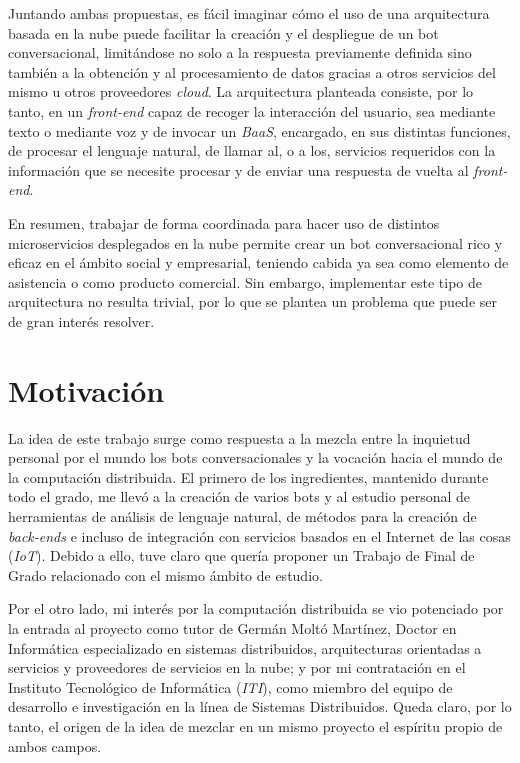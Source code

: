 \documentclass[11pt,spanish,listoffigures]{tfgetsinf}
\begin{document}
Juntando ambas propuestas, es fácil imaginar cómo el uso de una arquitectura basada en la nube puede facilitar la creación y el despliegue de un bot conversacional, limitándose no solo a la respuesta previamente definida sino también a la obtención y al procesamiento de datos gracias a otros servicios del mismo u otros proveedores \textit{\gls{cloud}}. La arquitectura planteada consiste, por lo tanto, en un \textit{\gls{front-end}} capaz de recoger la interacción del usuario, sea mediante texto o mediante voz y de invocar un \textit{BaaS}, encargado, en sus distintas funciones, de procesar el lenguaje natural, de llamar al, o a los, servicios requeridos con la información que se necesite procesar y de enviar una respuesta de vuelta al \textit{front-end}. 

En resumen, trabajar de forma coordinada para hacer uso de distintos \gls{microservicio}s desplegados en la nube permite crear un bot conversacional rico y eficaz en el ámbito social y empresarial, teniendo cabida ya sea como elemento de asistencia o como producto comercial. Sin embargo, implementar este tipo de arquitectura no resulta trivial, por lo que se plantea un problema que puede ser de gran interés resolver.


\section{Motivaci\'on}
\label{sec:motivacion}

La idea de este trabajo surge como respuesta a la mezcla entre la inquietud personal por el mundo los bots conversacionales y la vocación hacia el mundo de la computación distribuida. El primero de los ingredientes, mantenido durante todo el grado, me llevó a la creación de varios bots y al estudio personal de herramientas de análisis de lenguaje natural, de métodos para la creación de \textit{\gls{back-end}s} e incluso de integración con servicios basados en el Internet de las cosas (\textit{IoT}). Debido a ello, tuve claro que quería proponer un Trabajo de Final de Grado relacionado con el mismo ámbito de estudio.

Por el otro lado, mi interés por la computación distribuida se vio potenciado por la entrada al proyecto como tutor de Germán Moltó Martínez, Doctor en Informática especializado en sistemas distribuidos, arquitecturas orientadas a servicios y proveedores de servicios en la nube; y por mi contratación en el Instituto Tecnológico de Informática (\textit{ITI}), como miembro del equipo de desarrollo e investigación en la línea de Sistemas Distribuidos. Queda claro, por lo tanto, el origen de la idea de mezclar en un mismo proyecto el espíritu propio de ambos campos.
\end{document}
